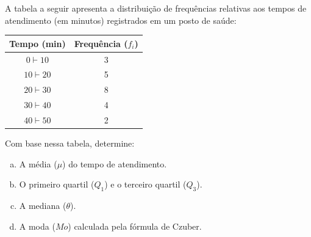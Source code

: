 %
%


\begin{exercicioBanco}[\valorquestao]
A tabela a seguir apresenta a distribuição de frequências relativas aos tempos de atendimento (em minutos) registrados em um posto de saúde:

\begin{center}
\begin{tabular}{|c|c|}
\hline
Tempo (min) & Frequência ($f_i$) \\ \hline
$0 \vdash 10$ & 3 \\ \hline
$10 \vdash 20$ & 5 \\ \hline
$20 \vdash 30$ & 8 \\ \hline
$30 \vdash 40$ & 4 \\ \hline
$40 \vdash 50$ & 2 \\ \hline
\end{tabular}
\end{center}

Com base nessa tabela, determine:

\begin{enumerate}[(a)]
    \item A média (\(\mu\)) do tempo de atendimento.
    \item O primeiro quartil ($Q_1$) e o terceiro quartil ($Q_3$).
    \item A mediana ($\theta$).
    \item A moda ($Mo$) calculada pela fórmula de Czuber.
\end{enumerate}
\end{exercicioBanco}
